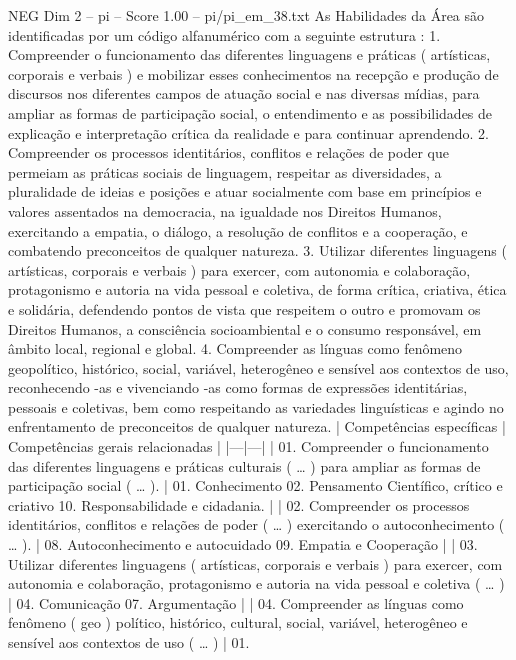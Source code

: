 \begin{textsample}{NEG Dim 2 – pi – Score 1.00 – pi/pi\_em\_38.txt}  \label{ex:f2_neg_200}
As Habilidades da Área são identificadas por um código alfanumérico com a seguinte estrutura : 1.
Compreender o funcionamento das diferentes linguagens e práticas ( artísticas, corporais e verbais ) e mobilizar esses conhecimentos na recepção e produção de discursos nos diferentes campos de atuação social e nas diversas mídias, para ampliar as formas de participação social, o entendimento e as possibilidades de explicação e interpretação crítica da realidade e para continuar aprendendo. 2.
Compreender os processos identitários, conflitos e relações de poder que permeiam as práticas sociais de linguagem, respeitar as diversidades, a pluralidade de ideias e posições e atuar socialmente com base em princípios e valores assentados na democracia, na igualdade nos Direitos Humanos, exercitando a empatia, o diálogo, a resolução de conflitos e a cooperação, e combatendo preconceitos de qualquer natureza. 3.
Utilizar diferentes linguagens ( artísticas, corporais e verbais ) para exercer, com autonomia e colaboração, protagonismo e autoria na vida pessoal e coletiva, de forma crítica, criativa, ética e solidária, defendendo pontos de vista que respeitem o outro e promovam os Direitos Humanos, a consciência socioambiental e o consumo responsável, em âmbito local, regional e global. 4.
Compreender as línguas como fenômeno geopolítico, histórico, social, variável, heterogêneo e sensível aos contextos de uso, reconhecendo -as e vivenciando -as como formas de expressões identitárias, pessoais e coletivas, bem como respeitando as variedades linguísticas e agindo no enfrentamento de preconceitos de qualquer natureza. | Competências específicas | Competências gerais relacionadas | |---|---| | 01.
Compreender o funcionamento das diferentes linguagens e práticas culturais ( … ) para ampliar as formas de participação social ( … ). | 01.
Conhecimento 02.
Pensamento Científico, crítico e criativo 10.
Responsabilidade e cidadania. | | 02.
Compreender os processos identitários, conflitos e relações de poder ( … ) exercitando o autoconhecimento ( … ). | 08.
Autoconhecimento e autocuidado 09.
Empatia e Cooperação | | 03.
Utilizar diferentes linguagens ( artísticas, corporais e verbais ) para exercer, com autonomia e colaboração, protagonismo e autoria na vida pessoal e coletiva ( … ) | 04.
Comunicação 07.
Argumentação | | 04.
Compreender as línguas como fenômeno ( geo ) político, histórico, cultural, social, variável, heterogêneo e sensível aos contextos de uso ( … ) | 01.

\end{textsample}
